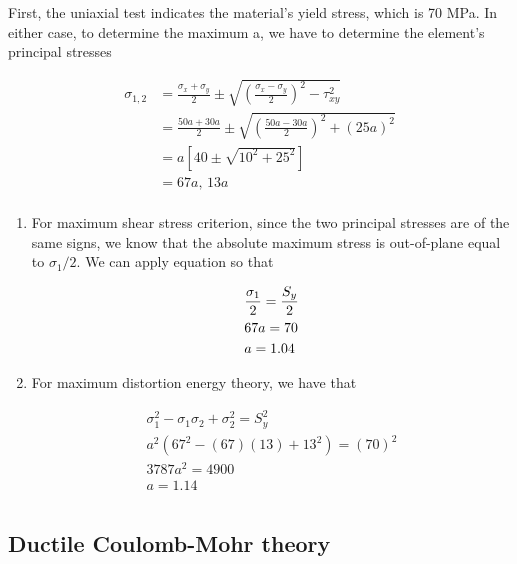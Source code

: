 \documentclass[
10pt,
a4paper,
openany,
svgnames,
]{book} %
\begin{document}
\begin{solution}

  First, the uniaxial test indicates the material’s yield stress, which is 70 MPa. In either case, to determine the maximum a, we have to determine the element’s principal stresses

  \begin{align*}
      \sigma_{1,2} &= \frac{\sigma_x + \sigma_y}{2} \pm \sqrt {\left( \frac{\sigma_x - \sigma_y}{2} \right)^2 - \tau _{xy}^2}  \\ 
                   &= \frac{50a + 30a}{2} \pm \sqrt {\left( \frac{50a - 30a}{2} \right)^2 + (25a)^2}  \\ 
                   &= a\left[ 40 \pm \sqrt {10^2 + 25^2} \right] \\ 
                   &= 67a \text{, } 13a \\ 
  \end{align*}
  
  \begin{enumerate}
  \item For maximum shear stress criterion, since the two principal stresses are of the same signs, we know that the absolute maximum stress is out-of-plane equal to $\sigma_1/2$. We can apply equation so that
    
    \[\begin{gathered}
        \frac{\sigma_1}{2} = \frac{S_y}{2} \hfill \\
        67a = 70 \hfill \\
        a = 1.04 \hfill \\ 
      \end{gathered} \]
    
  \item For maximum distortion energy theory, we have that
    
    \[\begin{gathered}
        \sigma_1^2 -\sigma_1\sigma_2 + \sigma_2^2 = S_y^2 \\ 
        a^2 \left( 67^2 - (67)(13) + 13^2 \right) = (70)^2 \\ 
        3787a^2 = 4900 \\ 
        a = 1.14 \\ 
      \end{gathered} \]
    \end{enumerate}
\end{solution}

\subsection{Ductile Coulomb-Mohr theory}
\end{document}
